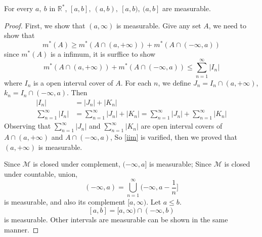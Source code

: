 \documentclass[lang=en, 12pt]{elegantbook}
\begin{document}
            \begin{proposition}
                For every $a, \ b$ in $\mathbb{R}^*$, $[a,b], \ (a,b), \ [a,b), \ (a,b]$ are measurable.\par
                
            \end{proposition}
            \begin{proof}
                First, we show that $(a,\infty)$ is measurable. Give any set $A$, we need to show that
                $$m^*(A) \geq m^*(A\cap (a,+\infty)) + m^*(A \cap (-\infty,a))$$
            since $m^*(A)$ is a infimum, it is surffice to show
                \begin{equation}
                    m^*(A\cap (a,+\infty)) + m^*(A \cap (-\infty,a)) \leq \sum_{n=1}^{\infty} |I_{n}| \label{iim}
                \end{equation}
            where $I_n$ is a open interval cover of $A$.
                For each $n$, we define $J_n = I_n \cap (a, +\infty)$, $k_n = I_n \cap (-\infty, a)$. Then 
                \begin{equation*}
                    \begin{aligned}
                        |I_n| &= |J_n| + |K_n|\\
                        \sum_{n=1}^{\infty}|I_n| &= \sum_{n=1}^{\infty} |J_n| + |K_n| = \sum_{n=1}^{\infty} |J_n| + \sum_{n=1}^{\infty}|K_n|
                    \end{aligned}
                \end{equation*}
            Observing that $\sum_{n=1}^{\infty} |J_n|$ and $\sum_{n=1}^{\infty}|K_n|$ are open interval covers of $A \cap (a, +\infty)$ and $A \cap (-\infty, a)$,
        So \eqref{iim} is varified, then we proved that $(a,+\infty)$ is measurable. \par
            Since $\mathcal{M}$ is closed under complement, $(-\infty, a]$ is measurable; Since $\mathcal{M}$ is closed under countable,
        union, 
        $$(-\infty, a) = \bigcup_{n=1}^{\infty} (-\infty, a-\frac{1}{n}]$$ 
        is measurable, and also its complement $[a, \infty)$. Let $a \leq b$. 
        $$[a, b] = [a, \infty) \cap (-\infty, b)$$
        is measurable. Other intervals are measurable can be shown in the same manner.
        \end{proof}
\end{document}
